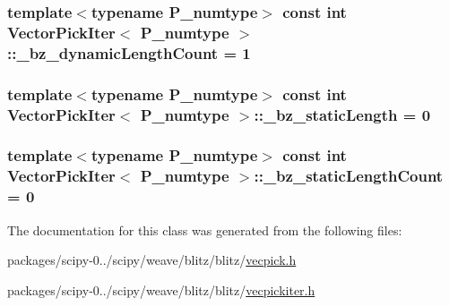 \subsubsection[{\+\_\+bz\+\_\+dynamic\+Length\+Count}]{\setlength{\rightskip}{0pt plus 5cm}template$<$typename P\+\_\+numtype$>$ const int {\bf Vector\+Pick\+Iter}$<$ P\+\_\+numtype $>$\+::\+\_\+bz\+\_\+dynamic\+Length\+Count = 1\hspace{0.3cm}{\ttfamily [static]}}\label{classVectorPickIter_a53b51cbbe675d8e9575d8adbb6b7bfa8}
\hypertarget{classVectorPickIter_a71f81c5af536d5f8ac87d1e91f8bac84}{}
\subsubsection[{\+\_\+bz\+\_\+static\+Length}]{\setlength{\rightskip}{0pt plus 5cm}template$<$typename P\+\_\+numtype$>$ const int {\bf Vector\+Pick\+Iter}$<$ P\+\_\+numtype $>$\+::\+\_\+bz\+\_\+static\+Length = 0\hspace{0.3cm}{\ttfamily [static]}}\label{classVectorPickIter_a71f81c5af536d5f8ac87d1e91f8bac84}
\hypertarget{classVectorPickIter_af457b51965968e83b9d4725eb89055b1}{}
\subsubsection[{\+\_\+bz\+\_\+static\+Length\+Count}]{\setlength{\rightskip}{0pt plus 5cm}template$<$typename P\+\_\+numtype$>$ const int {\bf Vector\+Pick\+Iter}$<$ P\+\_\+numtype $>$\+::\+\_\+bz\+\_\+static\+Length\+Count = 0\hspace{0.3cm}{\ttfamily [static]}}\label{classVectorPickIter_af457b51965968e83b9d4725eb89055b1}


The documentation for this class was generated from the following files\+:\begin{DoxyCompactItemize}
\item 
packages/scipy-\/0../scipy/weave/blitz/blitz/\hyperlink{vecpick_8h}{vecpick.\+h}\item 
packages/scipy-\/0../scipy/weave/blitz/blitz/\hyperlink{vecpickiter_8h}{vecpickiter.\+h}\end{DoxyCompactItemize}
